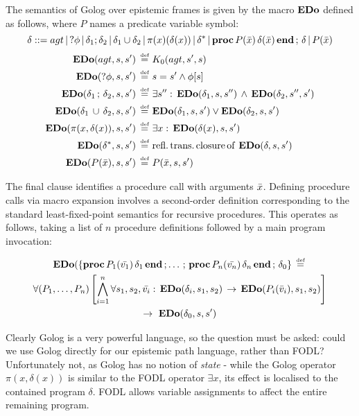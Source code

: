 \begin{defnL}
 The semantics of Golog
over epistemic frames is given by the macro $\mathbf{EDo}$ defined as follows,
where $P$ names a predicate variable symbol:\[
\delta::=agt\,|\,?\phi\,|\,\delta_{1};\delta_{2}\,|\,\delta_{1}\cup\delta_{2}\,|\,\pi(x)(\delta(x))\,|\,\delta^{*}\,|\,\mathbf{proc}\, P(\bar{x})\,\delta(\bar{x})\,\mathbf{end}\,;\,\delta\,|\, P(\bar{x})\]
 \begin{align*}
\mathbf{EDo}(agt,s,s')\,\stackrel{\mbox{\tiny def}}{=}\,\, & K_{0}(agt,s',s)\\
\mathbf{EDo}(?\phi,s,s')\,\stackrel{\mbox{\tiny def}}{=}\,\, & s=s'\wedge\phi[s]\\
\mathbf{EDo}(\delta_{1}\,;\,\delta_{2},s,s')\,\stackrel{\mbox{\tiny def}}{=}\,\, & \exists s'':\,\mathbf{EDo}(\delta_{1},s,s'')\,\wedge\,\mathbf{EDo}(\delta_{2},s'',s')\\
\mathbf{EDo}(\delta_{1}\,\cup\,\delta_{2},s,s')\,\stackrel{\mbox{\tiny def}}{=}\,\, & \mathbf{EDo}(\delta_{1},s,s')\vee\mathbf{EDo}(\delta_{2},s,s')\\
\mathbf{EDo}(\pi(x,\delta(x)),s,s')\,\stackrel{\mbox{\tiny def}}{=}\,\, & \exists x:\,\mathbf{EDo}(\delta(x),s,s')\\
\mathbf{EDo}(\delta^{*},s,s')\,\stackrel{\mbox{\tiny def}}{=}\,\, & \mathrm{refl.\, trans.\, closure\, of}\,\,\mathbf{EDo}(\delta,s,s')\\
\mathbf{EDo}(P(\bar{x}),s,s')\,\stackrel{\mbox{\tiny def}}{=}\,\, & P(\bar{x},s,s')\end{align*}

\end{defnL}
The final clause identifies a procedure call with arguments $\bar{x}$.
Defining procedure calls via macro expansion involves a second-order
definition corresponding to the standard least-fixed-point semantics
for recursive procedures. This operates as follows, taking a list
of $n$ procedure definitions followed by a main program invocation:

\begin{multline*}
\mathbf{EDo}(\{\mathbf{proc}\, P_{1}(\bar{v_{1}})\,\delta_{1}\,\mathbf{end}\,;\dots\,;\,\mathbf{proc}\, P_{n}(\bar{v_{n}})\,\delta_{n}\,\mathbf{end}\,;\,\delta_{0}\}\,\stackrel{\mbox{\tiny def}}{=}\,\\
\forall(P_{1},\dots,P_{n})\left[\bigwedge_{i=1}^{n}\forall s_{1},s_{2},\bar{v_{i}}:\,\mathbf{EDo}(\delta_{i},s_{1},s_{2})\,\rightarrow\,\mathbf{EDo}(P_{i}(\bar{v}_{i}),s_{1},s_{2})\right]\\
\rightarrow\,\,\mathbf{EDo}(\delta_{0},s,s')\end{multline*}


Clearly Golog is a very powerful language, so the question must be
asked: could we use Golog directly for our epistemic path language,
rather than FODL? Unfortunately not, as Golog has no notion of \emph{state}
- while the Golog operator $\pi(x,\delta(x))$ is similar to the FODL
operator $\exists x$, its effect is localised to the contained program
$\delta$. FODL allows variable assignments to affect the entire remaining
program.

